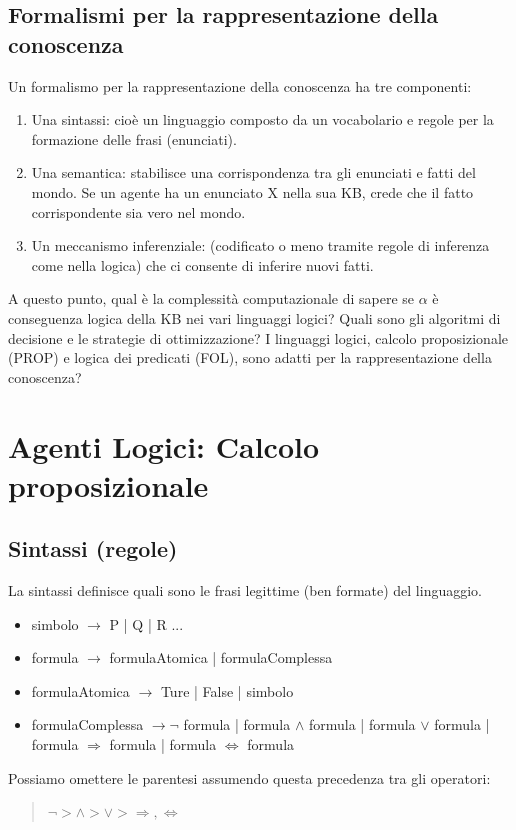 \documentclass{article}
\begin{document}
\subsection{Formalismi per la rappresentazione della conoscenza}
Un formalismo per la rappresentazione della conoscenza ha tre componenti:
\begin{enumerate}
    \item Una sintassi: cioè un linguaggio composto da un vocabolario e regole per la formazione delle frasi (enunciati).
    \item Una semantica: stabilisce una corrispondenza tra gli enunciati e fatti del mondo. Se un agente ha un enunciato X nella sua KB, crede che il fatto corrispondente sia vero nel mondo.
    \item Un meccanismo inferenziale: (codificato o meno tramite regole di inferenza come nella logica) che ci consente di inferire nuovi fatti. 
\end{enumerate}
A questo punto, qual è la complessità computazionale di sapere se $\alpha$ è conseguenza logica della KB nei vari linguaggi logici? Quali sono gli algoritmi di decisione e le strategie di ottimizzazione? I linguaggi logici, calcolo proposizionale (PROP) e logica dei predicati (FOL), sono adatti per la rappresentazione della conoscenza?

\section{Agenti Logici: Calcolo proposizionale}

\subsection{Sintassi (regole)}
La sintassi definisce quali sono le frasi legittime (ben formate) del linguaggio.
\begin{itemize}
    \item simbolo $\to$ P | Q | R ...
    \item formula $\to$ formulaAtomica | formulaComplessa
    \item formulaAtomica $\to$ Ture | False | simbolo
    \item formulaComplessa $\to \neg$ formula | formula $\land$ formula | formula $\lor$ formula | formula $\Rightarrow$ formula | formula $\Leftrightarrow$ formula
\end{itemize}
Possiamo omettere le parentesi assumendo questa precedenza tra gli operatori:
\begin{quote}
    $\neg  >  \land  >  \lor  >  \Rightarrow, \Leftrightarrow$
\end{quote}
\end{document}
